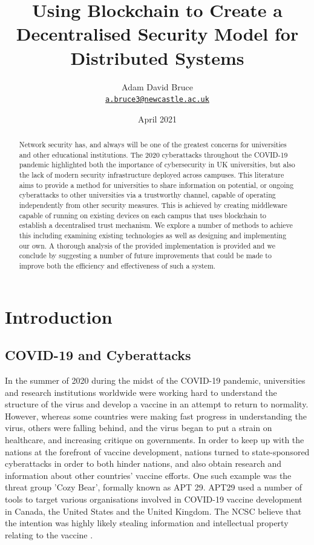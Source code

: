\documentclass[a4paper, 11pt]{report}
\title{\Huge{\textbf{Using Blockchain to Create a Decentralised Security Model for Distributed Systems}}}
\date{April 2021}
\author{
\Large{Adam David Bruce} \\ \texttt{\href{mailto:a.bruce3@newcastle.ac.uk}{a.bruce3@newcastle.ac.uk}}}
\begin{document}
\maketitle

\begin{abstract}
Network security has, and always will be one of the greatest concerns for universities and other educational institutions. The 2020 cyberattacks throughout the COVID-19 pandemic highlighted both the importance of cybersecurity in UK universities, but also the lack of modern security infrastructure deployed across campuses. This literature aims to provide a method for universities to share information on potential, or ongoing cyberattacks to other universities via a trustworthy channel, capable of operating independently from other security measures. This is achieved by creating middleware capable of running on existing devices on each campus that uses blockchain to establish a decentralised trust mechanism. We explore a number of methods to achieve this including examining existing technologies as well as designing and implementing our own. A thorough analysis of the provided implementation is provided and we conclude by suggesting a number of future improvements that could be made to improve both the efficiency and effectiveness of such a system.
\end{abstract}

\tableofcontents
\listoffigures
\listoftables

\newpage

\chapter{Introduction}
\section{COVID-19 and Cyberattacks}
In the summer of 2020 during the midst of the COVID-19 pandemic, universities and research institutions worldwide were working hard to understand the structure of the virus and develop a vaccine in an attempt to return to normality. However, whereas some countries were making fast progress in understanding the virus, others were falling behind, and the virus began to put a strain on healthcare, and increasing critique on governments. In order to keep up with the nations at the forefront of vaccine development, nations turned to state-sponsored cyberattacks in order to both hinder nations, and also obtain research and information about other countries' vaccine efforts. One such example was the threat group 'Cozy Bear', formally known as \acrfull{APT} 29. \acrshort{APT}29 used a number of tools to target various organisations involved in COVID-19 vaccine development in Canada, the United States and the United Kingdom. The \acrfull{NCSC} believe that the intention was highly likely stealing information and intellectual property relating to the vaccine \cite{APT29}.
\end{document}
